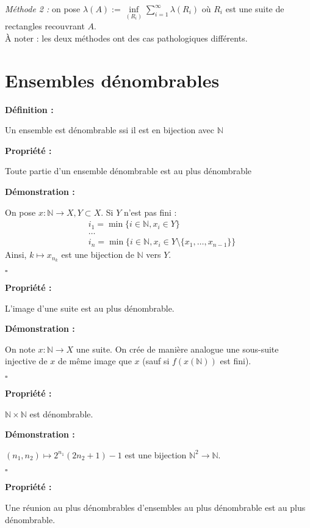 \documentclass[10pt,a4paper,notitlepage ]{report}
\newcommand{\1}{\mathds 1}
\newenvironment{definition}[1][]{
	
	\textbf{Définition #1 : }
}
{}
\newcounter{th}
\newenvironment{propriete}[1][]{
	\begin{tcolorbox}
		\textbf{Propriété #1 : }
}
{\end{tcolorbox}}
\newenvironment{demo}[1][]{

	\textbf{Démonstration #1 :}
}{\begin{flushright}
	$\square$
\end{flushright}
}
\begin{document}
\emph{Méthode 2 :} on pose $\lambda(A) := \underset{(R_i)}{\inf} \sum_{i=1}^{\infty}  \lambda(R_i)$ où $R_i$ est une suite de rectangles recouvrant $A$. \\

À noter : les deux méthodes ont des cas pathologiques différents.

\section{Ensembles dénombrables}

\begin{definition}
	Un ensemble est dénombrable ssi il est en bijection avec $\mathbb N$
\end{definition}
\begin{propriete}
	Toute partie d'un ensemble dénombrable est au plus dénombrable
\end{propriete}
\begin{demo}
	On pose $x : \mathbb N \rightarrow X, Y \subset X$. Si $Y$ n'est pas fini :
	\begin{align*}
	&i_1 = \min \{i\in\mathbb N, x_i \in Y \} \\
	&\dots  \\
 	&i_n = \min \{ i\in \mathbb N, x_i\in Y \setminus\{x_1, \dots,x_{n-1}\}\}
 	\end{align*} 
	Ainsi, $k \mapsto x_{n_k}$ est une bijection de $\mathbb N$ vers $Y$.
\end{demo}

\begin{propriete}
	L'image d'une suite est au plus dénombrable.
\end{propriete}
\begin{demo}
	On note $x:\mathbb N \rightarrow X$ une suite.
On crée de manière analogue une sous-suite injective de $x$ de même image que $x$ (sauf si $f(x(\mathbb N))$ est fini).
\end{demo}
\begin{propriete}
	$\mathbb N \times \mathbb N$ est dénombrable.
\end{propriete}
\begin{demo}
	$(n_1,n_2) \mapsto 2^{n_1} (2n_2+1) -1$ est une bijection $\mathbb N^2 \rightarrow \mathbb N$.
\end{demo}

\begin{propriete}
	Une réunion au plus dénombrables d'ensembles au plus dénombrable est au plus dénombrable.
\end{propriete}
\end{document}
